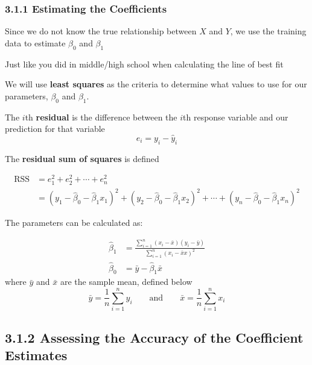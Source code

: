         \subsubsection*{3.1.1  Estimating the Coefficients}\label{estimating-the-coefficients}
        
        Since we do not know the true relationship between \(X\) and \(Y\), we use the training data to estimate \(\beta_0\) and \(\beta_1\)

        \begin{note}
            Just like you did in middle/high school when calculating the line of best fit
        \end{note}
        
        We will use \textbf{least squares} as the criteria to determine what values to use for our parameters, \(\beta_0\) and \(\beta_1\).
        
        The \(i\)th \textbf{residual} is the difference between the \(i\)th response variable and our prediction for that variable
        \begin{equation*}
        e_i = y_i - \hat y_i
        \end{equation*}
        
        The \textbf{residual sum of squares} is defined
        
        
        \begin{align*}
            \text{RSS} &= e_1^2 + e_2^2 + \cdots + e_n^2 \\
            &= (y_1 - \hat \beta_0 - \hat \beta_1 x_1)^2 + (y_2 - \hat \beta_0 - \hat \beta_1 x_2)^2  + \cdots + (y_n - \hat \beta_0 - \hat \beta_1 x_n)^2 
        \end{align*}
        
        
        The parameters can be calculated as:
        
        \begin{align*}\tag{3.4}
        \hat \beta_1 &= \frac{\sum_{i=1}^n(x_i - \bar x)(y_i-\bar y)}{\sum_{i=1}^n(x_i - \bar xx)^2}\\
        \hat \beta_0 &= \bar y - \hat \beta_1 \bar x
    \end{align*}
     where \(\bar y\) and \(\bar x\) are the sample mean, defined below
     \begin{equation*}
           \bar y = \frac{1}{n}\sum_{i=1}^n y_i \qquad \text{and} \qquad \bar x = \frac{1}{n}\sum_{i=1}^n x_i
     \end{equation*}

        \subsection*{3.1.2 Assessing the Accuracy of the Coefficient Estimates}
